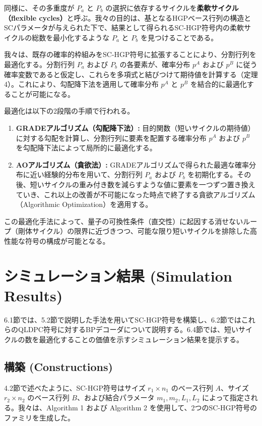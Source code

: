 \documentclass[a4paper,11pt]{article}
\begin{document}
同様に、その多重度が $P_a$ と $P_b$ の選択に依存するサイクルを\textbf{柔軟サイクル（flexible cycles）}と呼ぶ。我々の目的は、基となるHGPベース行列の構造とSCパラメータが与えられた下で、結果として得られるSC-HGP符号内の柔軟サイクルの総数を最小化するような $P_a$ と $P_b$ を見つけることである。

我々は、既存の確率的枠組みをSC-HGP符号に拡張することにより、分割行列を最適化する。分割行列 $P_a$ および $P_b$ の各要素が、確率分布 $p^A$ および $p^B$ に従う確率変数であると仮定し、これらを多項式と結びつけて期待値を計算する（定理4）。これにより、勾配降下法を適用して確率分布 $p^A$ と $p^B$ を結合的に最適化することが可能になる。

最適化は以下の2段階の手順で行われる。
\begin{enumerate}
    \item \textbf{GRADEアルゴリズム（勾配降下法）:} 目的関数（短いサイクルの期待値）に対する勾配を計算し、分割行列に要素を配置する確率分布 $p^A$ および $p^B$ を勾配降下法によって局所的に最適化する。
    \item \textbf{AOアルゴリズム（貪欲法）:} GRADEアルゴリズムで得られた最適な確率分布に近い経験的分布を用いて、分割行列 $P_a$ および $P_b$ を初期化する。その後、短いサイクルの重み付き数を減らすような値に要素を一つずつ置き換えていき、これ以上の改善が不可能になった時点で終了する貪欲アルゴリズム（Algorithmic Optimization）を適用する。
\end{enumerate}

この最適化手法によって、量子の可換性条件（直交性）に起因する消せないループ（剛体サイクル）の限界に近づきつつ、可能な限り短いサイクルを排除した高性能な符号の構成が可能となる。

\section{シミュレーション結果 (Simulation Results)}
6.1節では、5.2節で説明した手法を用いてSC-HGP符号を構築し、6.2節ではこれらのQLDPC符号に対するBPデコーダについて説明する。6.4節では、短いサイクルの数を最適化することの価値を示すシミュレーション結果を提示する。

\subsection{構築 (Constructions)}
4.2節で述べたように、SC-HGP符号はサイズ $r_1 \times n_1$ のベース行列 $A$、サイズ $r_2 \times n_2$ のベース行列 $B$、および結合パラメータ $m_1, m_2, L_1, L_2$ によって指定される。我々は、Algorithm 1 および Algorithm 2 を使用して、2つのSC-HGP符号のファミリを生成した。
\end{document}
